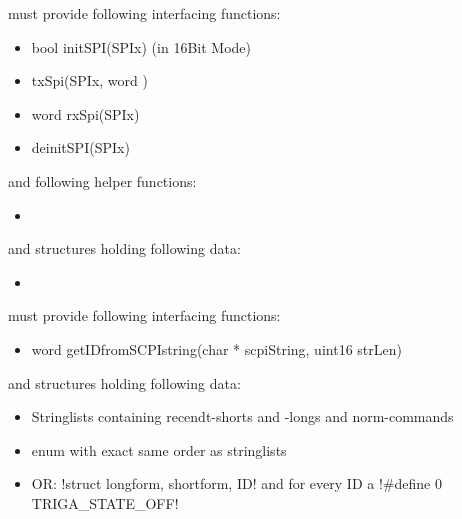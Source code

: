 	{	must provide following interfacing functions:
		\begin{itemize} \setlength\itemsep{1px}
		\item bool initSPI(SPIx) (in 16Bit Mode)
		\item txSpi(SPIx, word )
		\item word rxSpi(SPIx)
		\item deinitSPI(SPIx)
		\end{itemize}
		and following helper functions:
		\begin{itemize} \setlength\itemsep{1px}
		\item 
		\end{itemize}

		and structures holding following data:
		\begin{itemize} \setlength\itemsep{1px}
		\item 
		\end{itemize}

	}

	{	must provide following interfacing functions:
		\begin{itemize} \setlength\itemsep{1px}
		\item word getIDfromSCPIstring(char * scpiString, uint16 strLen)
		\end{itemize}

		and structures holding following data:
		\begin{itemize} \setlength\itemsep{1px}
		\item Stringlists containing recendt-shorts and -longs and norm-commands
		\item enum with exact same order as stringlists
		\item OR: \lstC !struct {longform, shortform, ID}! and for every ID a  \lstC !#define 0 TRIGA_STATE_OFF!
		\end{itemize}
	}


